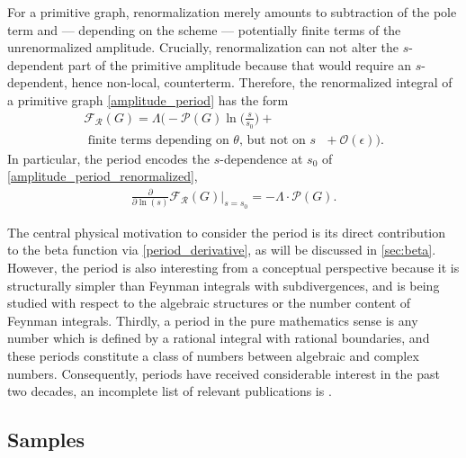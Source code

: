 \documentclass[12pt,a4paper]{article}
\newcommand{\ren} {{  \mathcal R}}
\newcommand{\period}{\mathcal P}
\renewcommand{\|}{\rule[-0.4ex]{0.2ex}{1.2em}}
\begin{document}
	For a  primitive  graph, renormalization merely amounts to subtraction of the pole term and --- depending on the scheme --- potentially finite terms of the unrenormalized amplitude. Crucially, renormalization can not alter the $s$-dependent part of the primitive amplitude because that would require an $s$-dependent, hence non-local, counterterm. Therefore, the renormalized integral of a primitive graph \cref{amplitude_period} has the form 
	\begin{multline}\label{amplitude_period_renormalized} 
		\mathcal F_\ren (G) =\Lambda \biggl(   - \period (G)\ln \biggl( \frac s {s_0}  \biggl)   + \\ \text{ finite terms depending on $\theta$, but not on $s$ }   + \mathcal  O ( \epsilon ) \biggr).
	\end{multline}
	In particular, the period encodes the $s$-dependence at $s_0$ of \cref{amplitude_period_renormalized},
	\begin{align}\label{period_derivative}
		\frac{\partial}{\partial \ln (s)} \mathcal F_\ren (G) \Big|_{s=s_0} = -\Lambda \cdot \period(G).
	\end{align}

	The central physical motivation to consider the period is its direct contribution to the beta function via \cref{period_derivative}, as will be discussed in \cref{sec:beta}. However, the period is also interesting from a conceptual perspective because it is structurally simpler than  Feynman integrals with subdivergences, and is being studied with respect to   the algebraic structures or the number content of Feynman integrals. Thirdly, a period in the pure mathematics sense is any number which is defined by a rational integral with rational boundaries, and these periods constitute a  class of numbers   between algebraic and complex numbers. Consequently,  periods have received considerable interest in the past two decades, an incomplete list of relevant publications is  \cite{kontsevich_periods_2001,belkale_periods_2003,brown_multiple_2006,schnetz_quantum_2010,brown_periods_2010,kreimer_quantum_2015,todorov_polylogarithms_2014,crump_period_2016,nasrollahpoursamami_periods_2016,crump_properties_2017,hu_further_2022,laradji_results_2021,borinsky_graphical_2022,borinsky_recursive_2022}.
	
	
	
	

\subsection{Samples}\label{sec:samples}
\end{document}
